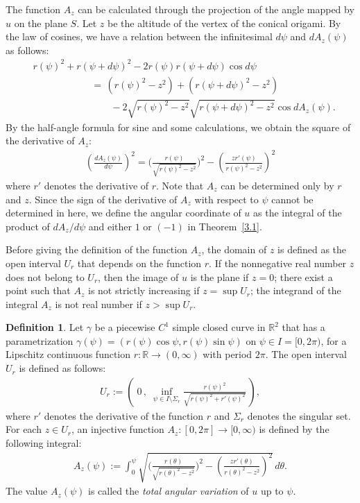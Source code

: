 \documentclass{amsart}
\theoremstyle{plain}
\theoremstyle{definition}
\newtheorem*{definition}{Definition}
\theoremstyle{remark}
\begin{document}
The function $A_z$ can be calculated through the projection of the angle mapped by $u$ on the plane $S$.
Let $z$ be the altitude of the vertex of the conical origami.
By the law of cosines, we have a relation between the infinitesimal $d\psi$ and $dA_z(\psi)$ as follows:
\begin{align*}
&r(\psi)^2+r(\psi+d\psi)^2-2r(\psi)r(\psi+d\psi)\cos d\psi\,
\\&\qquad\qquad\qquad=\,\left(r(\psi)^2-z^2\right)+\left(r(\psi+d\psi)^2-z^2\right)
\\&\qquad\qquad\qquad\qquad-2\sqrt{r(\psi)^2-z^2}\sqrt{r(\psi+d\psi)^2-z^2}\cos dA_z(\psi).
\end{align*}
By the half-angle formula for sine and some calculations, we obtain the square of the derivative of $A_z$:
\begin{align*}
\left(\frac{dA_z(\psi)}{d\psi}\right)^2=\biggl(\frac{r(\psi)}{\sqrt{r(\psi)^2-z^2}}\biggr)^2-\left(\frac{zr'(\psi)}{r(\psi)^2-z^2}\right)^2
\end{align*}
where $r'$ denotes the derivative of $r$.
Note that $A_z$ can be determined only by $r$ and $z$.
Since the sign of the derivative of $A_z$ with respect to $\psi$ cannot be determined in here, we define the angular coordinate of $u$ as the integral of the product of $dA_z/d\psi$ and either $1$ or $(-1)$ in Theorem~\ref{3.1}.

Before giving the definition of the function $A_z$, the domain of $z$ is defined as the open interval $U_r$ that depends on the function $r$. 
If the nonnegative real number $z$ does not belong to $U_r$, then the image of $u$ is the plane if $z=0$; there exist a point such that $A_z$ is not strictly increasing if $z=\sup U_r$; the integrand of the integral $A_z$ is not real number if $z>\sup U_r$.


\begin{definition}%
Let $\gamma$ be a piecewise $C^1$ simple closed curve in $\mathbb{R}^2$ that has a parametrization $\gamma(\psi)=(r(\psi)\cos\psi,r(\psi)\sin\psi)$ on $\psi\in I=[0,2\pi)$, for a Lipschitz continuous function $r \colon \mathbb{R}\to(0,\infty)$ with period $2\pi$.
The open interval $U_r$ is defined as follows:
\begin{align*}
U_r:=\left(\;0\,,\;\inf_{\psi\in I\setminus\Sigma_r}\frac{r(\psi)^2}{\sqrt{r(\psi)^2+r'(\psi)^2}}\,\right),
\end{align*}
where $r'$ denotes the derivative of the function $r$ and $\Sigma_r$ denotes the singular set.
For each $z\in U_r$, an injective function  $A_z \colon [0,2\pi]\to[0,\infty)$ is defined by the following integral:
\begin{align*}
A_z(\psi):=\int_0^{\psi}\sqrt{\biggl(\frac{r(\theta)}{\sqrt{r(\theta)^2-z^2}}\biggr)^2-\left(\frac{zr'(\theta)}{r(\theta)^2-z^2}\right)^2}\,d\theta.
\end{align*}
The value $A_z(\psi)$ is called the \emph{total angular variation} of $u$ up to $\psi$.
\end{definition}
\end{document}
